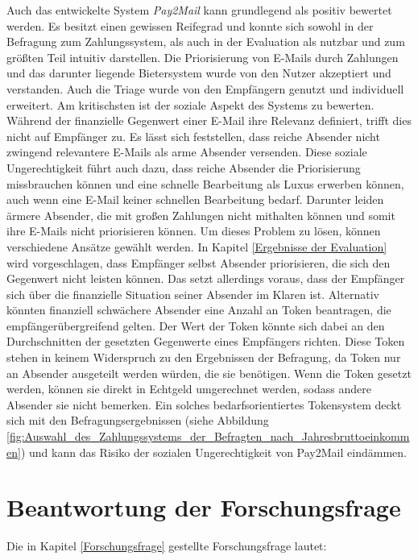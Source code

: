 Auch das entwickelte System \textit{Pay2Mail} kann grundlegend als positiv bewertet werden. Es besitzt einen gewissen Reifegrad und konnte sich sowohl in der Befragung zum Zahlungssystem, als auch in der Evaluation als nutzbar und zum größten Teil intuitiv darstellen. Die Priorisierung von E-Mails durch Zahlungen und das darunter liegende Bietersystem wurde von den Nutzer akzeptiert und verstanden. Auch die Triage wurde von den Empfängern genutzt und individuell erweitert. Am kritischsten ist der soziale Aspekt des Systems zu bewerten. Während der finanzielle Gegenwert einer E-Mail ihre Relevanz definiert, trifft dies nicht auf Empfänger zu. Es lässt sich feststellen, dass reiche Absender nicht zwingend relevantere E-Mails als arme Absender versenden. Diese soziale Ungerechtigkeit führt auch dazu, dass reiche Absender die Priorisierung missbrauchen können und eine schnelle Bearbeitung als Luxus erwerben können, auch wenn eine E-Mail keiner schnellen Bearbeitung bedarf. Darunter leiden ärmere Absender, die mit großen Zahlungen nicht mithalten können und somit ihre E-Mails nicht priorisieren können. Um dieses Problem zu lösen, können verschiedene Ansätze gewählt werden. In Kapitel \ref{Ergebnisse der Evaluation} wird vorgeschlagen, dass Empfänger selbst Absender priorisieren, die sich den Gegenwert nicht leisten können. Das setzt allerdings voraus, dass der Empfänger sich über die finanzielle Situation seiner Absender im Klaren ist. Alternativ könnten finanziell schwächere Absender eine Anzahl an Token beantragen, die empfängerübergreifend gelten. Der Wert der Token könnte sich dabei an den Durchschnitten der gesetzten Gegenwerte eines Empfängers richten. Diese Token stehen in keinem Widerspruch zu den Ergebnissen der Befragung, da Token nur an Absender ausgeteilt werden würden, die sie benötigen. Wenn die Token gesetzt werden, können sie direkt in Echtgeld umgerechnet werden, sodass andere Absender sie nicht bemerken. Ein solches bedarfsorientiertes Tokensystem deckt sich mit den Befragungsergebnissen (siehe Abbildung \ref{fig:Auswahl_des_Zahlungssystems_der_Befragten_nach_Jahresbruttoeinkommen}) und kann das Risiko der sozialen Ungerechtigkeit von Pay2Mail eindämmen.

\section{Beantwortung der Forschungsfrage}
\label{Beantwortung_der_Forschungsfrage}
Die in Kapitel \ref{Forschungsfrage} gestellte Forschungsfrage lautet:

